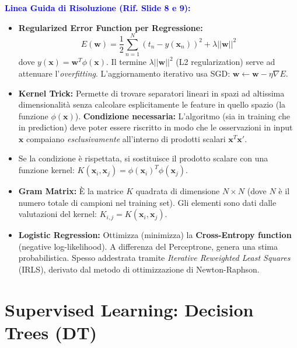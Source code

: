 \documentclass[11pt,a4paper]{article}
\begin{document}
\textbf{\textcolor{blue}{Linea Guida di Risoluzione (Rif. Slide 8 e 9):}}
\begin{itemize}
    \item \textbf{Regularized Error Function per Regressione:} 
    $$ E(\mathbf{w}) = \frac{1}{2} \sum_{n=1}^N (t_n - y(\mathbf{x}_n))^2 + \lambda ||\mathbf{w}||^2 $$
    dove $y(\mathbf{x}) = \mathbf{w}^T\phi(\mathbf{x})$. Il termine $\lambda ||\mathbf{w}||^2$ (L2 regularization) serve ad attenuare l'\textit{overfitting}. L'aggiornamento iterativo usa SGD: $\mathbf{w} \leftarrow \mathbf{w} - \eta \nabla E$.
    \item \textbf{Kernel Trick:} Permette di trovare separatori lineari in spazi ad altissima dimensionalità senza calcolare esplicitamente le feature in quello spazio (la funzione $\phi(\mathbf{x})$). \textbf{Condizione necessaria:} L'algoritmo (sia in training che in prediction) deve poter essere riscritto in modo che le osservazioni in input $\mathbf{x}$ compaiano \textit{esclusivamente} all'interno di prodotti scalari $\mathbf{x}^T\mathbf{x}'$.
    \item Se la condizione è rispettata, si sostituisce il prodotto scalare con una funzione kernel: $K(\mathbf{x}_i, \mathbf{x}_j) = \phi(\mathbf{x}_i)^T \phi(\mathbf{x}_j)$.
    \item \textbf{Gram Matrix:} È la matrice $K$ quadrata di dimensione $N \times N$ (dove $N$ è il numero totale di campioni nel training set). Gli elementi sono dati dalle valutazioni del kernel: $K_{i,j} = K(\mathbf{x}_i, \mathbf{x}_j)$.
    \item \textbf{Logistic Regression:} Ottimizza (minimizza) la \textbf{Cross-Entropy function} (negative log-likelihood). A differenza del Perceptrone, genera una stima probabilistica. Spesso addestrata tramite \textit{Iterative Reweighted Least Squares} (IRLS), derivato dal metodo di ottimizzazione di Newton-Raphson.
\end{itemize}

\section{Supervised Learning: Decision Trees (DT)}
\end{document}
